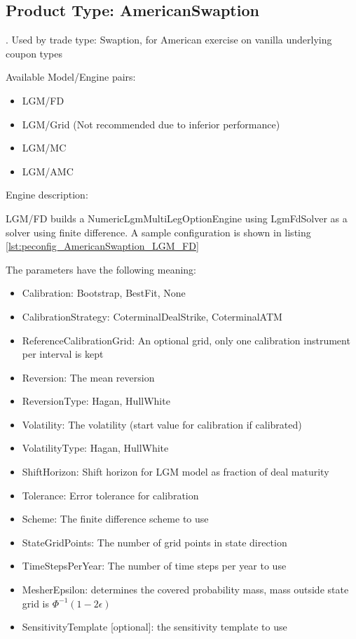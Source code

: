 \subsection{Product Type: AmericanSwaption}

\label{sec:AmericanSwaption_pt}.
Used by trade type: Swaption, for American exercise on vanilla underlying coupon types

Available Model/Engine pairs:

\begin{itemize}
\item LGM/FD
\item LGM/Grid (Not recommended due to inferior performance)
\item LGM/MC
\item LGM/AMC
\end{itemize}

Engine description:

LGM/FD builds a NumericLgmMultiLegOptionEngine using LgmFdSolver as a solver using finite difference. A sample
configuration is shown in listing \ref{lst:peconfig_AmericanSwaption_LGM_FD}

The parameters have the following meaning:

\begin{itemize}
\item Calibration: Bootstrap, BestFit, None
\item CalibrationStrategy: CoterminalDealStrike, CoterminalATM
\item ReferenceCalibrationGrid: An optional grid, only one calibration instrument per interval is kept
\item Reversion: The mean reversion
\item ReversionType: Hagan, HullWhite
\item Volatility: The volatility (start value for calibration if calibrated)
\item VolatilityType: Hagan, HullWhite
\item ShiftHorizon: Shift horizon for LGM model as fraction of deal maturity
\item Tolerance: Error tolerance for calibration
\item Scheme: The finite difference scheme to use
\item StateGridPoints: The number of grid points in state direction
\item TimeStepsPerYear: The number of time steps per year to use
\item MesherEpsilon: determines the covered probability mass, mass outside state grid is $\Phi^{-1}(1-2\epsilon)$
\item SensitivityTemplate [optional]: the sensitivity template to use 
\end{itemize}

